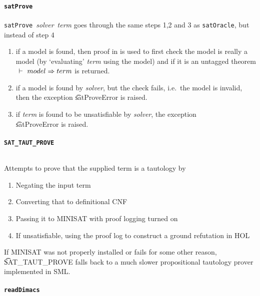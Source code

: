\paragraph{\tt satProve}${}$\\
{\small{\tt satProve}~{\it solver}~{\it term}} goes through the same steps 1,2 and 3 
as {\tt satOracle}, but instead of step 4

\begin{enumerate}
\item  if a model is found, then proof in \HOL{} is used to first check the model
is really a model (by `evaluating' {\it term} using the model) and if it
is an untagged theorem $\ \vdash\  model \Rightarrow term$ is returned.

\item if a model is found by {\it solver}, but the \HOL{} check fails, 
i.e.~the model is invalid, then the exception \t{satProveError} is raised.

\item if {\it term} is found to be unsatisfiable by {\it solver},
the exception \\ \t{satProveError} is raised.

\end{enumerate}

\paragraph{\tt SAT\_TAUT\_PROVE}${}$\\

Attempts to prove that the supplied term is a tautology by

\begin{enumerate}
\item Negating the input term
\item Converting that to definitional CNF
\item Passing it to MINISAT with proof logging turned on
\item If unsatisfiable, using the proof log to construct a ground refutation in HOL
\end{enumerate}

If MINISAT was not properly installed or fails for some other reason, \t{SAT\_TAUT\_PROVE} 
falls back to a much slower propositional tautology prover implemented in SML.

\paragraph{\tt readDimacs}${}$\\

